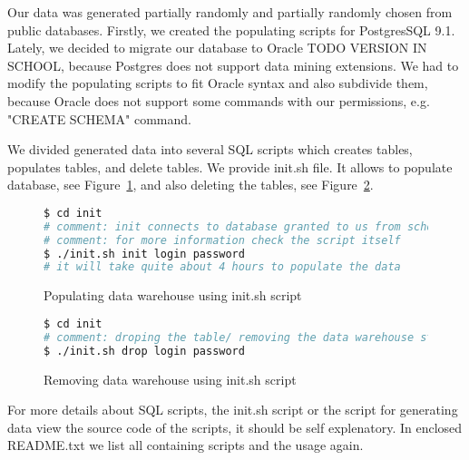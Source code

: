 
Our data was generated partially randomly and partially randomly chosen from public databases.
Firstly, we created the populating scripts for PostgresSQL 9.1. Lately, we decided to migrate
our database to Oracle TODO VERSION IN SCHOOL, because Postgres does not support data mining extensions.
We had to modify the populating scripts to fit Oracle syntax and also subdivide them,
because Oracle does not support some commands with our permissions, e.g. "CREATE SCHEMA" command.

We divided generated data into several SQL scripts which creates tables, populates tables, and delete tables.
We provide init.sh file. It allows to populate database, see Figure~\ref{l:ml1_init}, and also deleting the tables, see Figure~\ref{l:ml1_drop}.
\begin{figure}[!hbp]
\begin{lstlisting}[language=bash]
$ cd init
# comment: init connects to database granted to us from school
# comment: for more information check the script itself
$ ./init.sh init login password
# it will take quite about 4 hours to populate the data
\end{lstlisting}
\caption{Populating data warehouse using  init.sh script} \label{l:ml1_init}
\end{figure}

\begin{figure}[!hbp]
\begin{lstlisting}[language=bash]
$ cd init
# comment: droping the table/ removing the data warehouse still from init directory
$ ./init.sh drop login password
\end{lstlisting}
\caption{Removing data warehouse using  init.sh script} \label{l:ml1_drop}
\end{figure}

For more details about SQL scripts, the init.sh script or the script for generating data view the source code of the scripts, it should be self explenatory. In enclosed README.txt we list all containing scripts and the usage again.

